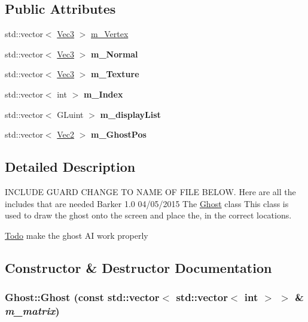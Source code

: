 \subsection*{Public Attributes}
\begin{DoxyCompactItemize}
\item 
std::vector$<$ \hyperlink{classVec3}{Vec3} $>$ \hyperlink{classGhost_ac4f35ef7a70aba7d457c615a860c6d64}{m\_\-Vertex}
\item 
\hypertarget{classGhost_a72a689f34e888a2ee94205631f72e167}{
std::vector$<$ \hyperlink{classVec3}{Vec3} $>$ {\bfseries m\_\-Normal}}
\label{classGhost_a72a689f34e888a2ee94205631f72e167}

\item 
\hypertarget{classGhost_af8f8984197702b619bde887380fdd756}{
std::vector$<$ \hyperlink{classVec3}{Vec3} $>$ {\bfseries m\_\-Texture}}
\label{classGhost_af8f8984197702b619bde887380fdd756}

\item 
\hypertarget{classGhost_ab7e8e6f1b122f00913d531a3da812e1e}{
std::vector$<$ int $>$ {\bfseries m\_\-Index}}
\label{classGhost_ab7e8e6f1b122f00913d531a3da812e1e}

\item 
\hypertarget{classGhost_adc3df9fc9cb61590448cb3805f604018}{
std::vector$<$ GLuint $>$ {\bfseries m\_\-displayList}}
\label{classGhost_adc3df9fc9cb61590448cb3805f604018}

\item 
\hypertarget{classGhost_a35ef98d0aefeec3e071b8186e4f94ce0}{
std::vector$<$ \hyperlink{classVec2}{Vec2} $>$ {\bfseries m\_\-GhostPos}}
\label{classGhost_a35ef98d0aefeec3e071b8186e4f94ce0}

\end{DoxyCompactItemize}


\subsection{Detailed Description}
INCLUDE GUARD CHANGE TO NAME OF FILE BELOW. Here are all the includes that are needed  Barker  1.0 04/05/2015 The \hyperlink{classGhost}{Ghost} class This class is used to draw the ghost onto the screen and place the, in the correct locations. \begin{Desc}
\item[\hyperlink{todo__todo000006}{Todo}]make the ghost AI work properly \end{Desc}


\subsection{Constructor \& Destructor Documentation}
\hypertarget{classGhost_a3244427b4bc41dd7ffdb2d3dcd7896f3}{
\subsubsection[{Ghost}]{\setlength{\rightskip}{0pt plus 5cm}Ghost::Ghost (const std::vector$<$ std::vector$<$ int $>$ $>$ \& {\em m\_\-matrix})}}
\label{classGhost_a3244427b4bc41dd7ffdb2d3dcd7896f3}


